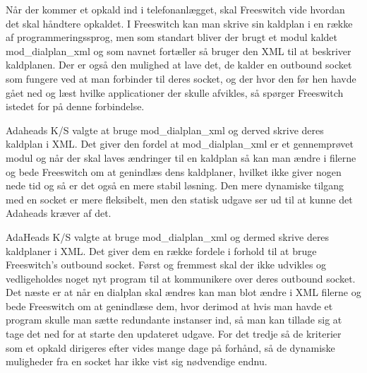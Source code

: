 Når der kommer et opkald ind i telefonanlægget, skal Freeswitch vide hvordan det skal håndtere opkaldet.
I Freeswitch kan man skrive sin kaldplan i en række af programmeringssprog, men som standart bliver der brugt et modul kaldet mod\_dialplan\_xml og som navnet fortæller så bruger den XML til at beskriver kaldplanen. Der er også den mulighed at lave det, de kalder en outbound socket som fungere ved at man forbinder til deres socket, og der hvor den før hen havde gået ned og læst hvilke applicationer der skulle afvikles, så spørger Freeswitch istedet for på denne forbindelse. 

Adaheads K/S valgte at bruge mod\_dialplan\_xml og derved skrive deres kaldplan i XML. Det giver den fordel at mod\_dialplan\_xml er et gennemprøvet modul og når der skal laves ændringer til en kaldplan så kan man ændre i filerne og bede Freeswitch om at genindlæs dens kaldplaner, hvilket ikke giver nogen nede tid og så er det også en mere stabil løsning. Den mere dynamiske tilgang med en socket er mere fleksibelt, men den statisk udgave ser ud til at kunne det Adaheads kræver af det.

AdaHeads K/S valgte at bruge mod\_dialplan\_xml og dermed skrive deres kaldplaner i XML. Det giver dem en række fordele i forhold til at bruge Freeswitch's outbound socket. 
Først og fremmest skal der ikke udvikles og vedligeholdes noget nyt program til at kommunikere over deres outbound socket. 
Det næste er at når en dialplan skal ændres kan man blot ændre i XML filerne og bede Freeswitch om at genindlæse dem, hvor derimod at hvis man havde et program skulle man sætte redundante instanser ind, så man kan tillade sig at tage det ned for at starte den updateret udgave. 
For det tredje så de kriterier som et opkald dirigeres efter vides mange dage på forhånd, så de dynamiske muligheder fra en socket har ikke vist sig nødvendige endnu.

\pagebreak
